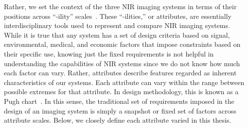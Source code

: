 Rather, we set the context of the three \ac{NIR} imaging systems in terms of their positions across ``-ility'' scales~\cite{DeWeck2012}. These ``-ilities,'' or attributes, are essentially interdisciplinary tools used to represent and compare \ac{NIR} imaging systems. While it is true that any system has a set of design criteria based on signal, environmental, medical, and economic factors that impose constraints based on their specific use, knowing just the fixed requirements is not helpful in understanding the capabilities of \ac{NIR} systems since we do not know how much each factor can vary. Rather, attributes describe features regarded as inherent characteristics of our systems. Each attribute can vary within the range between possible extremes for that attribute. In design methodology, this is known as a Pugh chart~\cite{Pugh1981}.  In this sense, the traditional set of requirements imposed in the design of an imaging system is simply a snapshot or fixed set of factors across attribute scales. Below, we closely define each attribute varied in this thesis.  

